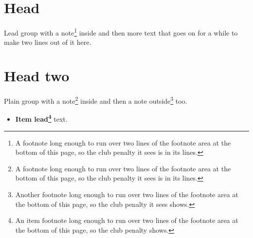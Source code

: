 \documentclass{article}
\begin{document}
\section{Head}
{\small Lead group with a note\footnote{A footnote long enough to run over two lines of the footnote area at the bottom of this page, so the club penalty it sees is in its lines.} inside} and then more text that goes on for a while to make two lines out of it here.

\section{Head two}
{Plain group with a note\footnote{A footnote long enough to run over two lines of the footnote area at the bottom of this page, so the club penalty it sees is in its lines.} inside} and then a note outside\footnote{Another footnote long enough to run over two lines of the footnote area at the bottom of this page, so the club penalty it sees shows.} too.

\begin{itemize}
\item {\bfseries Item lead\footnote{An item footnote long enough to run over two lines of the footnote area at the bottom of this page, so the club penalty shows.}} text.
\end{itemize}
\end{document}
